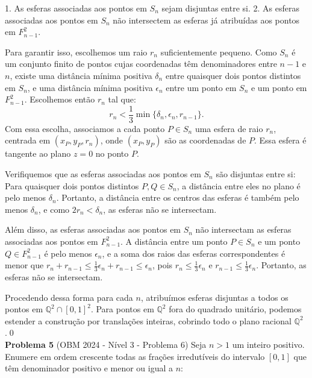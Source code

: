 \documentclass{hipatia}
\theoremstyle{definition} %
\begin{document}
1. As esferas associadas aos pontos em \( S_n \) sejam disjuntas entre si.
2. As esferas associadas aos pontos em \( S_n \) não intersectem as esferas já atribuídas aos pontos em \( F_{n-1}^2 \).

Para garantir isso, escolhemos um raio \( r_n \) suficientemente pequeno. Como \( S_n \) é um conjunto finito de pontos cujas coordenadas têm denominadores entre \( n-1 \) e \( n \), existe uma distância mínima positiva \( \delta_n \) entre quaisquer dois pontos distintos em \( S_n \), e uma distância mínima positiva \( \epsilon_n \) entre um ponto em \( S_n \) e um ponto em \( F_{n-1}^2 \). Escolhemos então \( r_n \) tal que:
\[
r_n < \frac{1}{3} \min\{\delta_n, \epsilon_n, r_{n-1}\}.
\]
Com essa escolha, associamos a cada ponto \( P \in S_n \) uma esfera de raio \( r_n \), centrada em \( (x_P, y_P, r_n) \), onde \( (x_P, y_P) \) são as coordenadas de \( P \). Essa esfera é tangente ao plano \( z = 0 \) no ponto \( P \).

Verifiquemos que as esferas associadas aos pontos em \( S_n \) são disjuntas entre si:\\
Para quaisquer dois pontos distintos \( P, Q \in S_n \), a distância entre eles no plano é pelo menos \( \delta_n \). Portanto, a distância entre os centros das esferas é também pelo menos \( \delta_n \), e como \( 2r_n < \delta_n \), as esferas não se intersectam.

Além disso, as esferas associadas aos pontos em \( S_n \) não intersectam as esferas associadas aos pontos em \( F_{n-1}^2 \). A distância entre um ponto \( P \in S_n \) e um ponto \( Q \in F_{n-1}^2 \) é pelo menos \( \epsilon_n \), e a soma dos raios das esferas correspondentes é menor que \( r_n + r_{n-1} \leq \frac{1}{3} \epsilon_n + r_{n-1} \leq \epsilon_n \), pois \( r_n \leq \frac{1}{3} \epsilon_n \) e \( r_{n-1} \leq \frac{1}{3} \epsilon_n \). Portanto, as esferas não se intersectam.

Procedendo dessa forma para cada \( n \), atribuímos esferas disjuntas a todos os pontos em \( \mathbb{Q}^2 \cap [0,1]^2 \). Para pontos em \( \mathbb{Q}^2 \) fora do quadrado unitário, podemos estender a construção por translações inteiras, cobrindo todo o plano racional \( \mathbb{Q}^2 \).\qed\\

\noindent \textbf{Problema 5} 
(OBM 2024 - Nível 3 - Problema 6) Seja $n > 1$ um inteiro positivo. Enumere em ordem crescente todas as frações irredutíveis do intervalo $[0,1]$ que têm denominador positivo e menor ou igual a $n$:
\end{document}
